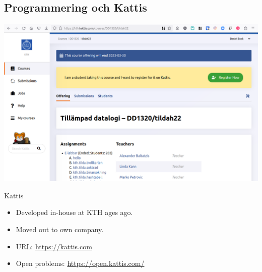 \subsection{Programmering och Kattis}

\begin{frame}[fragile]
  \begin{center}
    \includegraphics[width=\textwidth]{figs/kattis-tilda22.png}
  \end{center}
\end{frame}

\begin{frame}
  \begin{block}{Kattis}
    \begin{itemize}
      \item Developed in-house at KTH ages ago.
      \item Moved out to own company.
      \item URL: \url{https://kattis.com}
      \item Open problems: \url{https://open.kattis.com/}
    \end{itemize}
  \end{block}
\end{frame}

